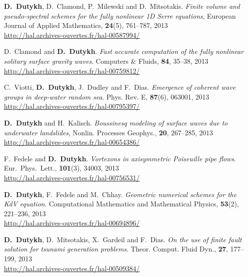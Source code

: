 \begin{etaremune}
  \item \textbf{D.~Dutykh}, D.~Clamond, P.~Milewski and D.~Mitsotakis. \textit{Finite volume and pseudo-spectral schemes for the fully nonlinear 1D Serre equations}, European Journal of Applied Mathematics, \textbf{24}(5), 761--787, 2013 \\ %
  \url{http://hal.archives-ouvertes.fr/hal-00587994/}
  
  \item D.~Clamond and \textbf{D.~Dutykh}. \textit{Fast accurate computation of the fully nonlinear solitary surface gravity waves}. Computers \& Fluids, \textbf{84}, 35--38, 2013 \\ %
  \url{http://hal.archives-ouvertes.fr/hal-00759812/}
  
  \item C.~Viotti, \textbf{D.~Dutykh}, J.~Dudley and F.~Dias. \textit{Emergence of coherent wave groups in deep-water random sea}. Phys. Rev. E, \textbf{87}(6), 063001, 2013 \\ %
  \url{http://hal.archives-ouvertes.fr/hal-00795397/}
  
  \item \textbf{D.~Dutykh} and H.~Kalisch. \textit{Boussinesq modeling of surface waves due to underwater landslides}, Nonlin. Processes Geophys., \textbf{20}, 267--285, 2013 \\ %
  \url{http://hal.archives-ouvertes.fr/hal-00654386/}

  \item F.~Fedele and \textbf{D.~Dutykh}. \textit{Vortexons in axisymmetric Poiseuille pipe flows}. Eur.~Phys.~Lett., \textbf{101}(3), 34003, 2013 \\ %
  \url{http://hal.archives-ouvertes.fr/hal-00756531/}
  
  \item \textbf{D.~Dutykh}, F.~Fedele and M.~Chhay. \textit{Geometric numerical schemes for the KdV equation}. Computational Mathematics and Mathematical Physics, \textbf{53}(2), 221--236, 2013 \\ %
  \url{http://hal.archives-ouvertes.fr/hal-00694896/}
  
  \item \textbf{D.~Dutykh}, D.~Mitsotakis, X.~Gardeil and F.~Dias. \textit{On the use of finite fault solution for tsunami generation problems}. Theor. Comput. Fluid Dyn., \textbf{27}, 177--199, 2013 \\ %
  \url{http://hal.archives-ouvertes.fr/hal-00509384/}


\end{etaremune}
